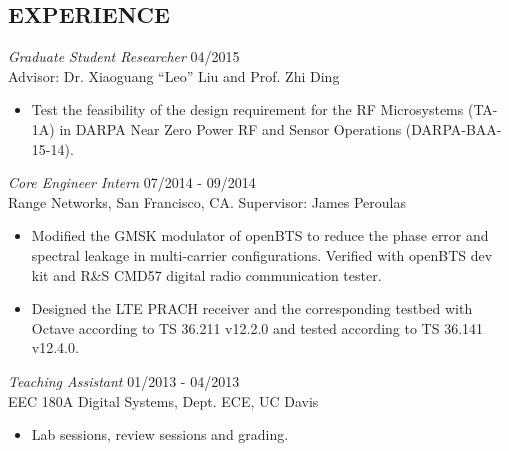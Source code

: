 \documentclass[margin]{res} %
\begin{document}
\begin{resume}
     
        \section{EXPERIENCE}
        {\sl Graduate Student Researcher} \hfill 04/2015 \\
        Advisor: Dr. Xiaoguang ``Leo'' Liu and Prof. Zhi Ding
        \begin{itemize} 
            \item Test the feasibility of the design requirement for the RF
            Microsystems (TA-1A) in DARPA Near Zero Power RF and Sensor
            Operations (DARPA-BAA-15-14).
        \end{itemize} 
        
        {\sl Core Engineer Intern} \hfill 07/2014 - 09/2014 \\
        Range Networks, San Francisco, CA. Supervisor: James Peroulas
        \begin{itemize} \itemsep -2pt %
            \item Modified the GMSK modulator of openBTS to reduce the phase
            error and spectral leakage in multi-carrier configurations. Verified
            with openBTS dev kit and R\&S CMD57 digital radio communication
            tester.
            \item Designed the LTE PRACH receiver and the corresponding testbed with
            Octave according to TS 36.211 v12.2.0 and tested according to TS 36.141
            v12.4.0.
        \end{itemize}
        
        {\sl Teaching Assistant} \hfill 01/2013 - 04/2013 \\
        EEC 180A Digital Systems, Dept. ECE, UC Davis
        \begin{itemize} 
            \item Lab sessions, review sessions and grading.
        \end{itemize} 
    
        

\end{resume}
\end{document}
